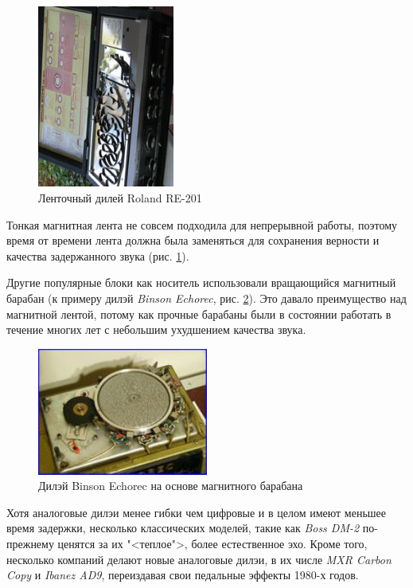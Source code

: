 \documentclass[oneside, final, 14pt]{extreport}
\begin{document}
\begin{figure}[h!]
  \centering
  \includegraphics[width=0.4\textwidth]{pic-delay-02}
  \caption{Ленточный дилей Roland RE-201}
  \label{pic-delay-02}
\end{figure}

Тонкая магнитная лента не совсем подходила для непрерывной работы, поэтому время от времени лента должна была заменяться для сохранения верности и качества задержанного звука (рис. \ref{pic-delay-02}).

Другие популярные блоки как носитель использовали вращающийся магнитный барабан (к примеру дилэй \emph{Binson Echorec}, рис. \ref{pic-delay-03}). Это давало преимущество над магнитной лентой, потому как прочные барабаны были в состоянии работать в течение многих лет с небольшим ухудшением качества звука.

\begin{figure}[h!]
  \centering
  \includegraphics[width=0.5\textwidth]{pic-delay-03}
  \caption{Дилэй Binson Echorec на основе магнитного барабана}
  \label{pic-delay-03}
\end{figure}

Хотя аналоговые дилэи менее гибки чем цифровые и в целом имеют меньшее время задержки, несколько классических моделей, такие как \emph{Boss DM-2} по-прежнему ценятся за их "<теплое">, более естественное эхо. Кроме того, несколько компаний делают новые аналоговые дилэи, в их числе \emph{MXR Carbon Copy} и \emph{Ibanez AD9}, переиздавая свои педальные эффекты 1980-х годов.
\end{document}
